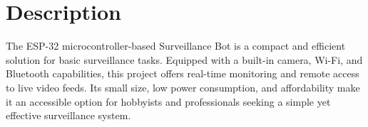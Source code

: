 \documentclass[12pt]{article}
\begin{document}



\newpage

\tableofcontents 

\newpage


\sectionfont{\setcounter{secnumdepth}{0}}
\section{Description}

The ESP-32 microcontroller-based Surveillance Bot is a compact and efficient solution for basic surveillance tasks. Equipped with a built-in camera, Wi-Fi, and Bluetooth capabilities, this project offers real-time monitoring and remote access to live video feeds. Its small size, low power consumption, and affordability make it an accessible option for hobbyists and professionals seeking a simple yet effective surveillance system. 
\end{document}
